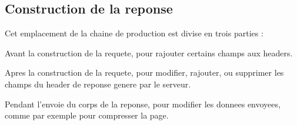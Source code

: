 \subsection {Construction de la reponse}
Cet emplacement de la chaine de production est divise en trois parties :

Avant la construction de la requete, pour rajouter certains champs aux headers.

Apres la construction de la requete, pour modifier, rajouter, ou supprimer les champs du header de reponse genere par le serveur.

Pendant l'envoie du corps de la reponse, pour modifier les donnees envoyees, comme par exemple pour compresser la page.


    \begin{figure}[h!]
    \end{figure}

